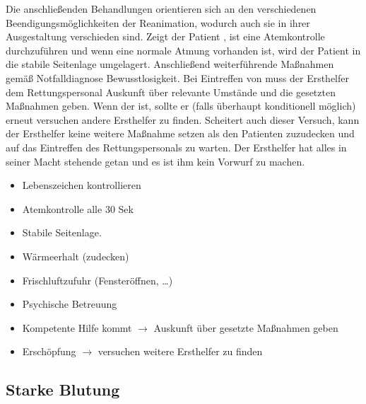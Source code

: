  
{%
Die anschließenden Behandlungen orientieren sich an den
verschiedenen Beendigungsmöglichkeiten der Reanimation,
wodurch auch sie in ihrer Ausgestaltung verschieden sind.
Zeigt der Patient , ist eine Atemkontrolle
durchzuführen und wenn eine normale Atmung vorhanden ist,
wird der Patient in die stabile Seitenlage umgelagert.
Anschließend weiterführende Maßnahmen gemäß Notfalldiagnose
Bewusstlosigkeit.
Bei Eintreffen von  muss der Ersthelfer
dem Rettungspersonal Auskunft über relevante Umstände und
die gesetzten Maßnahmen geben.
Wenn der  ist, sollte er (falls
überhaupt konditionell möglich) erneut versuchen andere 
Ersthelfer zu finden. Scheitert auch dieser Versuch, kann
der Ersthelfer keine weitere Maßnahme setzen als den
Patienten zuzudecken und auf das Eintreffen des 
Rettungspersonals zu warten. Der Ersthelfer hat alles in
seiner Macht stehende getan und es ist ihm kein Vorwurf zu
machen.
}{
\begin{itemize}
  \item Lebenszeichen kontrollieren
  \item Atemkontrolle alle 30 Sek
  \item Stabile Seitenlage.
  \item Wärmeerhalt (zudecken)
  \item Frischluftzufuhr (Fensteröffnen, \ldots)
  \item Psychische Betreuung
  \item Kompetente Hilfe kommt ${\rightarrow}$ Auskunft über gesetzte
  Maßnahmen geben
  \item Erschöpfung ${\rightarrow}$ versuchen weitere Ersthelfer zu
  finden
\end{itemize}

}{}{}{}




\subsection{Starke Blutung}
\label{topic:starke-blutung}


\protect{}
\protect{}

